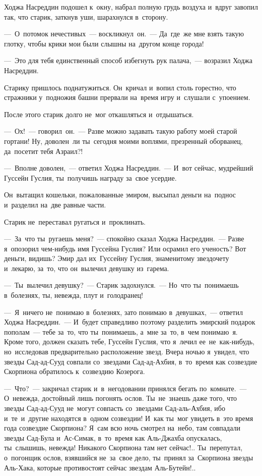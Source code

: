 \documentclass[12pt,a4paper]{book}
\begin{document}
Ходжа Насреддин подошел к~окну, набрал полную грудь воздуха и~вдруг завопил так, что старик, заткнув уши, шарахнулся в~сторону.

—~О~потомок нечестивых~— воскликнул~он.~— Да~где~же мне взять такую глотку, чтобы крики мои были слышны на~другом конце города!

—~Это для тебя единственный способ избегнуть рук палача,~— возразил Ходжа Насреддин.

Старику пришлось поднатужиться. Он~кричал и~вопил столь горестно, что стражники у~подножия башни прервали на~время игру и~слушали с~упоением.

После этого старик долго не~мог откашляться и~отдышаться.

—~Ох!~— говорил~он.~— Разве можно задавать такую работу моей старой гортани! Ну, доволен~ли ты~сегодня моими воплями, презренный оборванец, да~посетит тебя Азраил?!

—~Вполне доволен,~— ответил Ходжа Насреддин.~— И~вот сейчас, мудрейший Гуссейн Гуслия, ты~получишь награду за~свое усердие.

Он~вытащил кошельки, пожалованные эмиром, высыпал деньги на~поднос и~разделил на~две равные части.

Старик не~переставал ругаться и~проклинать.

—~За~что ты~ругаешь меня?~— спокойно сказал Ходжа Насреддин.~— Разве я~опозорил чем-нибудь имя Гуссейна Гуслия? Или осрамил его ученость? Вот деньги, видишь? Эмир дал их~Гуссейну Гуслия, знаменитому звездочету и~лекарю, за~то, что он~вылечил девушку из~гарема.

—~Ты~вылечил девушку?~— Старик задохнулся.~— Но~что ты~понимаешь в~болезнях, ты, невежда, плут и~голодранец!

—~Я~ничего не~понимаю в~болезнях, зато понимаю в~девушках,~— ответил Ходжа Насреддин.~— И~будет справедливо поэтому разделить эмирский подарок пополам~— тебе за~то, что ты~понимаешь, а~мне за~то, в~чем понимаю~я. Кроме того, должен сказать тебе, Гуссейн Гуслия, что я~лечил ее~не~как-нибудь, но~исследовав предварительно расположение звезд. Вчера ночью я~увидел, что звезды Сад-ад-Сууд совпали со~звездами Сад-ад-Ахбия, в~то~время как созвездие Скорпиона обратилось к~созвездию Козерога.

—~Что?~— закричал старик и~в~негодовании принялся бегать по~комнате.~— О~невежда, достойный лишь погонять ослов. Ты~не~знаешь даже того, что звезды Сад-ад-Сууд не~могут совпасть со~звездами Сад-аль-Ахбия, ибо и~те~и~другие находятся в~одном созвездии! И~как ты~мог увидеть в~это время года созвездие Скорпиона? Я~сам всю ночь смотрел на~небо, там совпадали звезды Сад-Була и~Ас-Симак, в~то~время как Аль-Джахба опускалась, ты~слышишь, невежда! Никакого Скорпиона там нет сейчас!.. Ты~перепутал, о~погонщик ослов, взявшийся не~за~свое дело, ты~принял за~Скорпиона звезды Аль-Хака, которые противостоят сейчас звездам Аль-Бутейн!..
\end{document}

